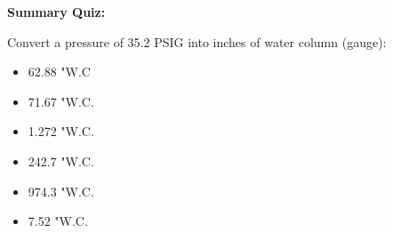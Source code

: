 





\vfil \eject

\noindent
{\bf Summary Quiz:}

Convert a pressure of 35.2 PSIG into inches of water column (gauge):

\begin{itemize}
\item{} 62.88 "W.C
\vskip 5pt 
\item{} 71.67 "W.C.
\vskip 5pt 
\item{} 1.272 "W.C.
\vskip 5pt 
\item{} 242.7 "W.C.
\vskip 5pt 
\item{} 974.3 "W.C.
\vskip 5pt 
\item{} 7.52 "W.C.
\end{itemize}





